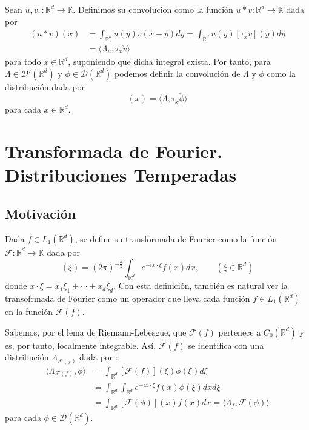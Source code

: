\begin{definicion}
Sean $u,v,:\mathds{R}^{d}\rightarrow \mathds{K}$. Definimos su convolución como la función $u*v: \mathds{R}^{d}\rightarrow \mathds{K}$ dada por 
\begin{align*}
(u*v)(x) &
= \int_{\mathds{R}^{d}} u(y)v(x-y)dy 
= \int_{\mathds{R}^{d}} u(y) [\tau_{x}\check{v}](y) dy  \\
& = \langle  \Lambda_{u},\tau_{x}\check{v} \rangle 
\end{align*}
para todo $x\in\mathds{R}^{d}$, suponiendo que dicha integral exista. Por tanto, para $\Lambda\in \mathcal{D}'(\mathds{R}^{d})$ y $\phi\in \mathcal{D}(\mathds{R}^{d})$ podemos definir la convolución de $\Lambda$ y $\phi$ como la distribución dada por
\begin{equation}
[\Lambda * \phi] (x)  = \langle \Lambda, \tau_{x}\check{\phi} \rangle
\end{equation}
para cada $x\in\mathds{R}^{d}$.
\end{definicion}

\section{Transformada de Fourier. Distribuciones Temperadas}

\subsection{Motivación}

\begin{definicion}
Dada $f\in L_{1}(\mathds{R}^{d})$,  se define su transformada de Fourier como la función $\mathcal{F}:\mathds{R}^{d}\rightarrow\mathds{K}$ dada por 
\begin{equation} 
[\mathcal{F}(f)](\xi) = (2\pi )^{-\frac{d}{2}}\int_{\mathds{R}^{d}}e^{-ix\cdot\xi}f(x)dx, \qquad(\xi\in\mathds{R}^{d})
\end{equation}
donde $x\cdot\xi = x_{1}\xi_{1}+\cdots+x_{d}\xi_{d}$. Con esta definición, también es natural ver la transofrmada de Fourier como un operador que lleva cada función $f\in L_{1}(\mathds{R}^{d})$ en la función $\mathcal{F}(f)$.  

Sabemos, por el lema de Riemann-Lebesgue, que $\mathcal{F}(f)$ pertenece a $ C_{0}(\mathds{R}^{d})$ y es, por tanto, localmente integrable. Así, $\mathcal{F}(f)$ se identifica con una distribución $\Lambda_{\mathcal{F}(f)}$ dada por :
\begin{align*}
\langle \Lambda_{\mathcal{F}(f)},\phi \rangle & = \int_{\mathds{R}^{d}} 
[\mathcal{F}(f)](\xi)\phi (\xi) d\xi \\
 & = \int_{\mathds{R}^{d}} \int_{\mathds{R}^{d}}e^{-ix\cdot\xi} f(x)\phi(\xi)dxd\xi \\
& = \int_{\mathds{R}^{d}} [\mathcal{F}(\phi)](x)f(x) dx=  \langle \Lambda_f,  \mathcal{F}(\phi)\rangle
\end{align*}
para cada $\phi\in
  \mathcal{D}
  (\mathds{R}^{d})$.
\end{definicion}

